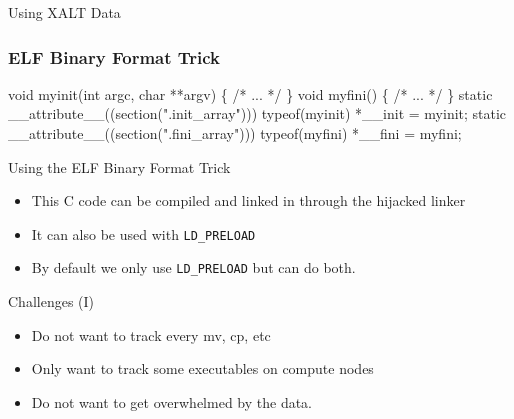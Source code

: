 \documentclass{beamer}
\begin{document}
\begin{frame}{Using XALT Data}
\end{frame}

\begin{frame}[fragile]
    \frametitle{ELF Binary Format Trick}
 {\small
    \begin{semiverbatim}
void myinit(int argc, char **argv)
\{
  /* ... */
\}
void myfini()
\{
  /* ... */
\}
  static __attribute__((section(".init_array")))
       typeof(myinit) *__init = myinit;
  static __attribute__((section(".fini_array")))
       typeof(myfini) *__fini = myfini;
    \end{semiverbatim}
}
\end{frame}

\begin{frame}{Using the ELF Binary Format Trick}
  \begin{itemize}
    \item This C code can be compiled and linked in through the hijacked linker
    \item It can also be used with \texttt{LD\_PRELOAD}
    \item By default we only use \texttt{LD\_PRELOAD} but can do both.
  \end{itemize}
\end{frame}

\begin{frame}{Challenges (I)}
  \begin{itemize}
    \item Do not want to track every mv, cp, etc
    \item Only want to track some executables on compute nodes
    \item Do not want to get overwhelmed by the data. 
  \end{itemize}
\end{frame}
\end{document}
